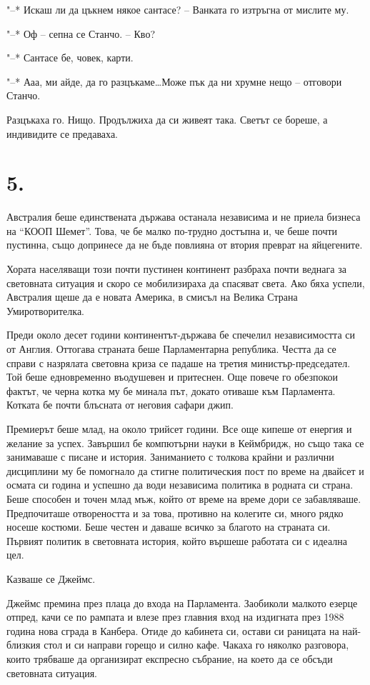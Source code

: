 \documentclass[ebook,openany,12pt]{memoir}
\begin{document}
"--* Искаш ли да цъкнем някое сантасе? – Ванката го изтръгна от мислите му.

"--* Оф – сепна се Станчо. – Кво?

"--* Сантасе бе, човек, карти.

"--* Ааа, ми айде, да го разцъкаме\ldots Може пък да ни хрумне нещо – отговори Станчо.

Разцъкаха го. Нищо. Продължиха да си живеят така. Светът се бореше, а индивидите се предаваха.

\section*{5.}

Австралия беше единствената държава останала независима и не приела бизнеса на ``КООП Шемет''. Това, че бе малко по-трудно достъпна и, че беше почти пустинна, също допринесе да не бъде повлияна от втория преврат на яйцегените. 

Хората населяващи този почти пустинен континент разбраха почти веднага за световната ситуация и скоро се мобилизираха да спасяват света. Ако бяха успели, Австралия щеше да е новата Америка, в смисъл на Велика Страна Умиротворителка.

Преди около десет години континентът-държава бе спечелил независимостта си от Англия. Оттогава страната беше Парламентарна република. Честта да се справи с назрялата световна криза се падаше на третия мини\-стър-председател. Той беше едновременно въодушевен и притеснен. Още повече го обезпокои фактът, че черна котка му бе минала път, докато отиваше към Парламента. Котката бе почти блъсната от неговия сафари джип.

Премиерът беше млад, на около трийсет години. Все още кипеше от енергия и желание за успех. Завършил бе компютърни науки в Кеймбридж, но също така се занимаваше с писане и история. Заниманието с толкова крайни и различни дисциплини му бе помогнало да стигне политическия пост по време на двайсет и осмата си година и успешно да води независима политика в родната си страна. Беше способен и точен млад мъж, който от време на време дори се забавляваше. Предпочиташе отвореността и за това, противно на колегите си, много рядко носеше костюми. Беше честен и даваше всичко за благото на страната си. Първият политик в световната история, който вършеше работата си с идеална цел.

Казваше се Джеймс.

Джеймс премина през плаца до входа на Парламента. Заобиколи малкото езерце отпред, качи се по рампата и влезе през главния вход на издигната през 1988 година нова сграда в Канбера. Отиде до кабинета си, остави си раницата на най-близкия стол и си направи горещо и силно кафе. Чакаха го няколко разговора, които трябваше да организират експресно събрание, на което да се обсъди световната ситуация.
\end{document}
